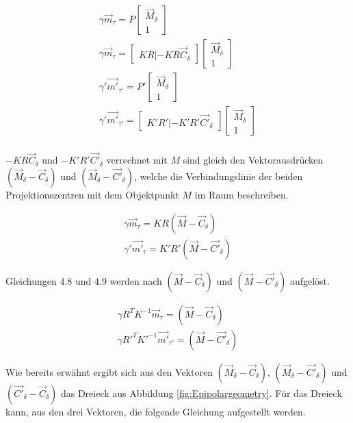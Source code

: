 \begin{gather}
\gamma\vec{m}_\tau = P \begin{bmatrix}\vec{M}_\delta\\1\end{bmatrix}\\
\gamma\vec{m}_\tau = \begin{bmatrix}KR|-KR\vec{C}_\delta\end{bmatrix}\begin{bmatrix}\vec{M}_\delta\\1\end{bmatrix}\\
\gamma'\vec{m'}_{\tau'} = P' \begin{bmatrix}\vec{M}_\delta\\1\end{bmatrix}\\
\gamma'\vec{m'}_{\tau'} = \begin{bmatrix}K'R'|-K'R'\vec{C'}_\delta\end{bmatrix}\begin{bmatrix}\vec{M}_\delta\\1\end{bmatrix}\\
\end{gather}

$-KR\vec{C}_\delta$ und $-K'R'\vec{C'}_\delta$ verrechnet mit $M$ sind gleich den Vektorausdrücken $(\vec{M}_\delta - \vec{C}_\delta)$ und $(\vec{M}_\delta - \vec{C'}_\delta)$, welche die Verbindungslinie der beiden Projektionszentren mit dem Objektpunkt $M$ im Raum beschreiben.

\begin{gather}
\gamma\vec{m}_\tau = KR(\vec{M}-\vec{C}_\delta)\\
\gamma'\vec{m'}_\tau = K'R'(\vec{M}-\vec{C'}_\delta)
\end{gather}

Gleichungen 4.8 und 4.9 werden nach $(\vec{M}-\vec{C}_\delta)$ und $(\vec{M}-\vec{C'}_\delta)$ aufgelöst.

\begin{gather}
\gamma R^TK^{-1}\vec{m}_\tau = (\vec{M}-\vec{C}_\delta)\\
\gamma R'^TK'^{-1}\vec{m'}_{\tau'} = (\vec{M}-\vec{C'}_\delta)
\end{gather}

Wie bereits erwähnt ergibt sich aus den Vektoren $(\vec{M}_\delta - \vec{C}_\delta),\, (\vec{M}_\delta - \vec{C'}_\delta)$ und $(\vec{C'}_\delta - \vec{C}_\delta)$ das Dreieck aus Abbildung \ref{fig:Epipolargeometry}. Für das Dreieck kann, aus den drei Vektoren, die folgende Gleichung aufgestellt werden. 

